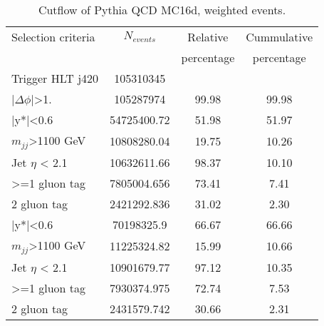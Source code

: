 \begin{table}[ht]
\begin{center}
\begin{tabular}{|l|c|c|c|}
\hline
Selection criteria & $N_{events}$ & Relative & Cummulative  \\
 & & percentage & percentage \\
\hline
Trigger HLT j420 & 105310345 &  &  \\
$|\Delta\phi|$>1. & 105287974 & 99.98 & 99.98 \\
\hline\hline
|y*|<0.6 & 54725400.72 & 51.98 & 51.97 \\
$m_{jj}$>1100 GeV & 10808280.04 & 19.75 & 10.26 \\
Jet $\eta$ < 2.1 & 10632611.66 & 98.37 & 10.10 \\
>=1 gluon tag & 7805004.656 & 73.41 & 7.41 \\
2 gluon tag & 2421292.836 & 31.02 & 2.30 \\
\hline\hline
|y*|<0.6 & 70198325.9 & 66.67 & 66.66 \\
$m_{jj}$>1100 GeV & 11225324.82 & 15.99 & 10.66 \\
Jet $\eta$ < 2.1 & 10901679.77 & 97.12 & 10.35 \\
>=1 gluon tag & 7930374.975 & 72.74 & 7.53 \\
2 gluon tag & 2431579.742 & 30.66 & 2.31 \\
\hline
\end{tabular}
\end{center}
\caption{Cutflow of Pythia QCD MC16d, weighted events.}
\end{table}

